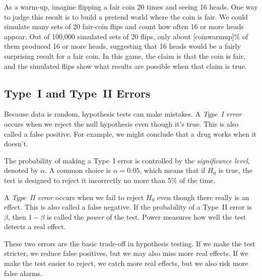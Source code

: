 As a warm-up, imagine flipping a fair coin 20 times and seeing 16
heads. One way to judge this result is to build a pretend world where
the coin is fair. We could simulate many sets of 20 fair-coin flips and
count how often 16 or more heads appear:
Out of 100,000 simulated sets of 20 flips, only about
[coinwarmup]\% of them
produced 16 or more heads, suggesting that 16 heads would be a fairly
surprising result for a fair coin. 
In this game, the claim is that the coin is fair, and the simulated
flips show what results are possible when that claim is true.

\subsection{Type~I and Type~II Errors}

Because data is random, hypothesis tests can make mistakes. A
\emph{Type~I error} occurs when we reject
the null hypothesis even though it's true. This is also called a false
positive. For example, we might conclude that a drug works when it
doesn't.

The probability of making a Type~I error is controlled by the
\emph{significance level}, denoted by
$\alpha$. A common choice is $\alpha = 0.05$, which means that if
$H_0$ is true, the test is designed to reject it incorrectly no more than
5\% of the time.

A \emph{Type~II error} occurs when we fail
to reject $H_0$ even though there really is an effect. This is also
called a false negative. If the probability of a Type~II error is
$\beta$, then $1 - \beta$ is called the \emph{power}
of the test. Power measures how well the test detects a real effect.

These two errors are the basic trade-off in hypothesis testing. If we
make the test stricter, we reduce false positives, but we may also miss
more real effects. If we make the test easier to reject, we catch more
real effects, but we also risk more false alarms.


